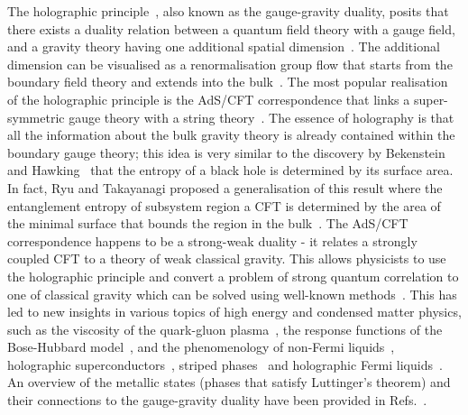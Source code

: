 The holographic principle~\cite{bousso_2002,katz_2010,green_holography_2013,Hartnoll_2009,sachdev_2012,zaanen_liu_sun_schalm_2015,anosh_2015,nastase_2015,Erdmenger_2018}, also known as the gauge-gravity duality, posits that there exists a duality relation between a quantum field theory with a gauge field, and a gravity theory having one additional spatial dimension~\cite{hooft_1974,polyakov_1978,polyakov_strings,gross_1993}.
The additional dimension can be visualised as a renormalisation group flow that starts from the boundary field theory and extends into the bulk~\cite{akhmedov_1998,alvarez_1999,freedman_1999,porrati_1999,kachru_2000,girardello_2000,de2000,de_2001,Johnson_2001,Yamaguchi_2003}.
The most popular realisation of the holographic principle is the AdS/CFT correspondence that links a super-symmetric gauge theory with a string theory~\cite{maldacena1999large,gubser_1998,witten1998anti}.
The essence of holography is that all the information about the bulk gravity theory is already contained within the boundary gauge theory; this idea is very similar to the discovery by Bekenstein and Hawking~\cite{bekenstein_1973,Hawking_1974,Hawking_1975} that the entropy of a black hole is determined by its surface area. In fact, Ryu and Takayanagi proposed a generalisation of this result where the entanglement entropy of subsystem region a CFT is determined by the area of the minimal surface that bounds the region in the bulk~\cite{ryu2006,ryu2006aspects}.
The AdS/CFT correspondence happens to be a strong-weak duality - it relates a strongly coupled CFT to a theory of weak classical gravity.
This allows physicists to use the holographic principle and convert a problem of strong quantum correlation to one of classical gravity which can be solved using well-known methods~\cite{Hartnoll_2009,sachdev_2012}.
This has led to new insights in various topics of high energy and condensed matter physics, such as the viscosity of the quark-gluon plasma~\cite{kovtun_2005}, the response functions of the Bose-Hubbard model~\cite{damle_1997,hartnoll_2007}, and the phenomenology of non-Fermi liquids~\cite{lee_2009_nonfermi,lio_2011,faulkner_2011,mihailo_2009}, holographic superconductors~\cite{gubser_2010,gauntlett_2009,hartnoll_2008_building,Hartnoll_2008,Cai2015,Wang2020}, striped phases~\cite{Donos2011,Donos2013,Cremonini2018} and holographic Fermi liquids~\cite{kachru_2008,cubrovic_2011,senthil_2003,sachdev_2011,Hartnoll_2011_stellar}. An overview of the metallic states (phases that satisfy Luttinger's theorem) and their connections to the gauge-gravity duality have been provided in Refs.~\cite{huijse_2011,Aprile2011,Donos2011_superfluid}.


